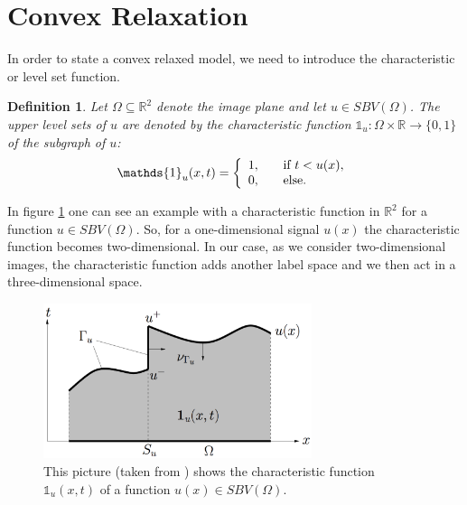 \documentclass{scrreprt}
\newtheorem{definition}[theorem]{Definition}
\begin{document}
    \section{Convex Relaxation} %
    \label{sec:convex_relaxation}

        In order to state a convex relaxed model, we need to introduce the characteristic or level set function.

        \begin{definition}
        \label{def:characteristic_function}
            Let $\Omega \subseteq \mathbb{R}^{2}$ denote the image plane and let $u \in SBV(\Omega)$. The upper level sets of $u$ are denoted by the characteristic function $\mathds{1}_{u}: \Omega \times \mathbb{R} \longrightarrow \{ 0, 1 \}$ of the subgraph of $u$:
                \begin{equation}
                    \mathds{1}_{u}(x, t) =
                        \left\{
                            \begin{array}{l l}
                                1, & \quad \text{if $t < u(x)$}, \\
                                0, & \quad \text{else}.
                            \end{array}
                        \right.
                \label{eq:characteristic_function}
                \end{equation}
        \end{definition}

        In figure \ref{fig:characteristic_function} one can see an example with a characteristic function in $\mathbb{R}^{2}$ for a function $u \in SBV(\Omega)$. So, for a one-dimensional signal $u(x)$ the characteristic function becomes two-dimensional. In our case, as we consider two-dimensional images, the characteristic function adds another label space and we then act in a three-dimensional space.

        \begin{figure}[!ht]
            \centering
            \includegraphics[width=0.7\textwidth]{img/char_func.png}
            \caption[Characteristic Function of a SBV function.]{\label{fig:characteristic_function} This picture (taken from \cite{Pock-et-al-iccv09}) shows the characteristic function $\mathds{1}_{u}(x, t)$ of a function $u(x) \in SBV(\Omega)$.}
        \end{figure}
\end{document}
